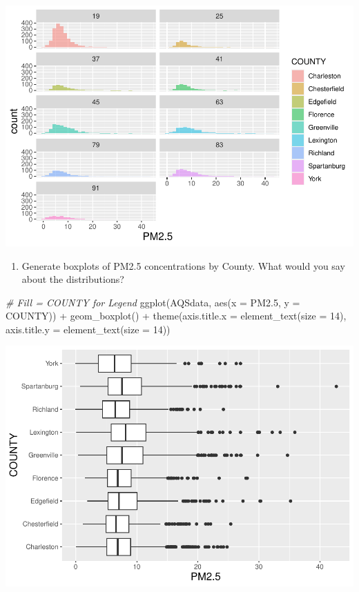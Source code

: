 \documentclass[
]{article}
\newenvironment{Shaded}{\begin{snugshade}}{\end{snugshade}}
\newcommand{\AttributeTok}[1]{\textcolor[rgb]{0.77,0.63,0.00}{#1}}
\newcommand{\CommentTok}[1]{\textcolor[rgb]{0.56,0.35,0.01}{\textit{#1}}}
\newcommand{\DecValTok}[1]{\textcolor[rgb]{0.00,0.00,0.81}{#1}}
\newcommand{\FloatTok}[1]{\textcolor[rgb]{0.00,0.00,0.81}{#1}}
\newcommand{\FunctionTok}[1]{\textcolor[rgb]{0.00,0.00,0.00}{#1}}
\newcommand{\NormalTok}[1]{#1}
\newcommand{\SpecialCharTok}[1]{\textcolor[rgb]{0.00,0.00,0.00}{#1}}
\providecommand{\tightlist}{%
  \setlength{\itemsep}{0pt}\setlength{\parskip}{0pt}}
\begin{document}
\includegraphics{HW1-Trinath-Sai-Subhash-Reddy-Pittala_files/figure-latex/unnamed-chunk-20-1.pdf}

\begin{enumerate}
\def\labelenumi{\alph{enumi}.}
\setcounter{enumi}{3}
\tightlist
\item
  Generate boxplots of PM2.5 concentrations by County. What would you
  say about the distributions?
\end{enumerate}

\begin{Shaded}
\begin{Highlighting}[]
\CommentTok{\# Fill = COUNTY for Legend}
\FunctionTok{ggplot}\NormalTok{(AQSdata, }\FunctionTok{aes}\NormalTok{(}\AttributeTok{x =}\NormalTok{ PM2}\FloatTok{.5}\NormalTok{, }\AttributeTok{y =}\NormalTok{ COUNTY)) }\SpecialCharTok{+} \FunctionTok{geom\_boxplot}\NormalTok{() }\SpecialCharTok{+}
    \FunctionTok{theme}\NormalTok{(}\AttributeTok{axis.title.x =} \FunctionTok{element\_text}\NormalTok{(}\AttributeTok{size =} \DecValTok{14}\NormalTok{), }\AttributeTok{axis.title.y =} \FunctionTok{element\_text}\NormalTok{(}\AttributeTok{size =} \DecValTok{14}\NormalTok{))}
\end{Highlighting}
\end{Shaded}

\includegraphics{HW1-Trinath-Sai-Subhash-Reddy-Pittala_files/figure-latex/unnamed-chunk-21-1.pdf}
\end{document}
